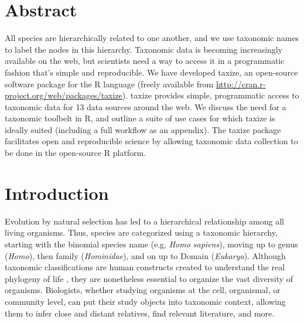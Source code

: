 \begin{sloppypar}
\section{Abstract} 
\label{sec:taxize:abstract} 
All species are hierarchically related to one another, and we use taxonomic names to label the nodes in this hierarchy. 
Taxonomic data is becoming increasingly available on the web, but scientists need a way to access it in a programmatic fashion that's simple and reproducible. 
We have developed taxize, an open-source software package for the R language (freely available from \url{http://cran.r-project.org/web/packages/taxize}). 
taxize provides simple, programmatic access to taxonomic data for 13 data sources around the web. 
We discuss the need for a taxonomic toolbelt in R, and outline a suite of use cases for which taxize is ideally suited (including a full workflow as an appendix). 
The taxize package facilitates open and reproducible science by allowing taxonomic data collection to be done in the open-source R platform.

\section{Introduction} 
\label{sec:taxize:introduction} 
Evolution by natural selection has led to a hierarchical relationship among all living organisms.  
Thus, species are categorized using a taxonomic hierarchy, starting with the binomial species name (e.g, \emph{Homo sapiens}), moving up to genus (\emph{Homo}), then family (\emph{Hominidae}), and on up to Domain (\emph{Eukarya}). 
Although taxonomic classifications are human constructs created to understand the real phylogeny of life \citep{benton2000}, they are nonetheless essential to organize the vast diversity of organisms. 
Biologists, whether studying organisms at the cell, organismal, or community level, can put their study objects into taxonomic context, allowing them to infer close and distant relatives, find relevant literature, and more. 


\end{sloppypar}
